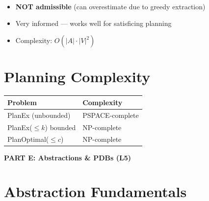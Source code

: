 \documentclass[11pt,a4paper]{article}
\begin{document}
\begin{warningbox}[FF Properties]
\begin{itemize}[leftmargin=*,nosep]
\item \textbf{NOT admissible} (can overestimate due to greedy extraction)
\item Very informed --- works well for satisficing planning
\item Complexity: $O(|A| \cdot |V|^2)$
\end{itemize}
\end{warningbox}

\section{Planning Complexity}

\begin{definitionbox}
\begin{center}
\begin{tabular}{@{}ll@{}}
\toprule
\textbf{Problem} & \textbf{Complexity} \\
\midrule
PlanEx (unbounded) & PSPACE-complete \\
PlanEx($\leq k$) bounded & NP-complete \\
PlanOptimal($\leq c$) & NP-complete \\
\bottomrule
\end{tabular}
\end{center}
\end{definitionbox}

\newpage
\begin{center}
\textbf{\LARGE PART E: Abstractions \& PDBs (L5)}
\end{center}
\vspace{1em}

\renewcommand{\thesection}{E.\arabic{section}}

\section{Abstraction Fundamentals}
\end{document}
